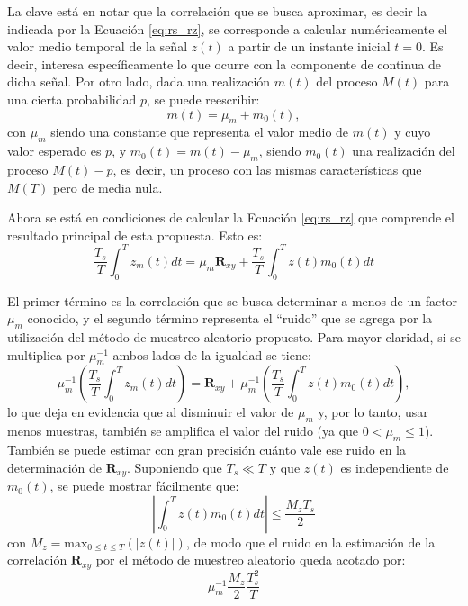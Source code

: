 La clave está en notar que la correlación que se busca aproximar, es decir la indicada por la Ecuación \ref{eq:rs_rz}, se corresponde a calcular numéricamente el valor medio temporal de la señal $z(t)$  a partir de un instante inicial $t=0$. Es decir, interesa específicamente lo que ocurre con la componente de continua de dicha señal. Por otro lado, dada una realización $m(t)$ del proceso $M(t)$ para una cierta probabilidad $p$, se puede reescribir:
\begin{equation}
    m(t)=\mu_m+m_0(t),
\end{equation}
con $\mu_m$ siendo una constante que representa el valor medio de $m(t)$ y cuyo valor esperado es $p$, y $m_0(t)=m(t)-\mu_m$, siendo $m_0(t)$ una realización del proceso $M(t)-p$, es decir, un proceso con las mismas características que $M(T)$ pero de media nula.

Ahora se está en condiciones de calcular la Ecuación \ref{eq:rs_rz} que comprende el resultado principal de esta propuesta. Esto es:
\begin{equation}
    \frac{T_s}{T}\int_0^T z_m(t)dt = \mu_m \mathbf{R}_{xy} + \frac{T_s}{T} \int_0^T z(t)m_0(t)dt
\end{equation}

El primer término es la correlación que se busca determinar a menos de un factor $\mu_m$ conocido, y el segundo término representa el ``ruido'' que se agrega por la utilización del método de muestreo aleatorio propuesto. Para mayor claridad, si se multiplica por $\mu_m^{-1}$ ambos lados de la igualdad se tiene:
\begin{equation}
    \mu_m^{-1} \left( \frac{T_s}{T} \int_0^T z_m(t)dt \right) = \mathbf{R}_{xy}+\mu_m^{-1} \left(\frac{T_s}{T}  \int_0^T z(t)m_0(t)dt \right),
\end{equation}
lo que deja en evidencia que al disminuir el valor de $\mu_m$ y, por lo tanto, usar menos muestras, también se amplifica el valor del ruido (ya que $0<\mu_m\leq 1$). También se puede estimar con gran precisión cuánto vale ese ruido en la determinación de $\mathbf{R}_{xy}$. Suponiendo que $T_s \ll T$ y que $z(t)$ es independiente de $m_0(t)$, se puede mostrar fácilmente que:
\begin{equation}
    \left| \int_0^T z(t)m_0(t)dt \right| \leq \frac{M_z T_s}{2}
\end{equation}
con $M_z=\mathrm{max}_{0\leq t \leq T} (|z(t)|)$, de modo que el ruido en la estimación de la correlación $\mathbf{R}_{xy}$ por el método de muestreo aleatorio queda acotado por:
\begin{equation}
    \mu_m^{-1} \frac{M_z}{2} \frac{T_s^2}{T}
\end{equation}

